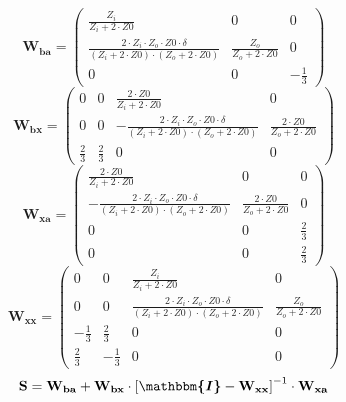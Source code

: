 \[ \mathbf{W_{ba}} = \left(\begin{smallmatrix} \frac{Z_i}{Z_i+2\cdot
Z0} & 0 & 0 \\ \frac{2\cdot Z_i\cdot Z_o\cdot Z0\cdot
\delta}{\left(Z_i+2\cdot Z0\right)\cdot\left(Z_o+2\cdot Z0\right)} &
\frac{Z_o}{Z_o+2\cdot Z0} & 0 \\ 0 & 0 & -\frac{1}{3}
\end{smallmatrix}\right) \]
\[ \mathbf{W_{bx}} = \left(\begin{smallmatrix} 0 & 0 & \frac{2\cdot
Z0}{Z_i+2\cdot Z0} & 0 \\ 0 & 0 & -\frac{2\cdot Z_i\cdot Z_o\cdot
Z0\cdot \delta}{\left(Z_i+2\cdot Z0\right)\cdot\left(Z_o+2\cdot
Z0\right)} & \frac{2\cdot Z0}{Z_o+2\cdot Z0} \\ \frac{2}{3} &
\frac{2}{3} & 0 & 0 \end{smallmatrix}\right) \]
\[ \mathbf{W_{xa}} = \left(\begin{smallmatrix} \frac{2\cdot
Z0}{Z_i+2\cdot Z0} & 0 & 0 \\ -\frac{2\cdot Z_i\cdot Z_o\cdot Z0\cdot
\delta}{\left(Z_i+2\cdot Z0\right)\cdot\left(Z_o+2\cdot Z0\right)} &
\frac{2\cdot Z0}{Z_o+2\cdot Z0} & 0 \\ 0 & 0 & \frac{2}{3} \\ 0 & 0 &
\frac{2}{3} \end{smallmatrix}\right) \]
\[ \mathbf{W_{xx}} = \left(\begin{smallmatrix} 0 & 0 &
\frac{Z_i}{Z_i+2\cdot Z0} & 0 \\ 0 & 0 & \frac{2\cdot Z_i\cdot
Z_o\cdot Z0\cdot \delta}{\left(Z_i+2\cdot
Z0\right)\cdot\left(Z_o+2\cdot Z0\right)} & \frac{Z_o}{Z_o+2\cdot Z0}
\\ -\frac{1}{3} & \frac{2}{3} & 0 & 0 \\ \frac{2}{3} & -\frac{1}{3} &
0 & 0 \end{smallmatrix}\right) \]
\[ \mathbf{S}=\mathbf{W_{ba}}+\mathbf{W_{bx}}\cdot\left[
\boldsymbol{\mathbbm{I}}
-\mathbf{W_{xx}}\right]^{-1}\cdot\mathbf{W_{xa}} \]
